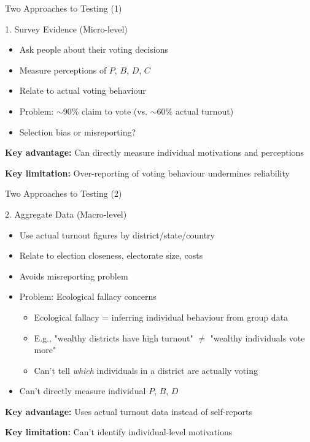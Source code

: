 \documentclass[10pt]{beamer}
\begin{document}
\begin{frame}{Two Approaches to Testing (1)}
\begin{block}{1. Survey Evidence (Micro-level)}
\begin{itemize}
\item Ask people about their voting decisions
\item Measure perceptions of $P$, $B$, $D$, $C$
\item Relate to actual voting behaviour
\item \alert{Problem:} $\sim$90\% claim to vote (vs. $\sim$60\% actual turnout)
\item Selection bias or misreporting?
\end{itemize}
\end{block}

\vspace{0.5cm}

\textbf{Key advantage:} Can directly measure individual motivations and perceptions

\textbf{Key limitation:} Over-reporting of voting behaviour undermines reliability
\end{frame}

\begin{frame}{Two Approaches to Testing (2)}
\begin{block}{2. Aggregate Data (Macro-level)}
\begin{itemize}
\item Use actual turnout figures by district/state/country
\item Relate to election closeness, electorate size, costs
\item Avoids misreporting problem
\item \alert{Problem:} Ecological fallacy concerns
\begin{itemize}
\footnotesize
\item Ecological fallacy = inferring individual behaviour from group data
\item E.g., "wealthy districts have high turnout" $\neq$ "wealthy individuals vote more"
\item Can't tell \emph{which} individuals in a district are actually voting
\end{itemize}
\item Can't directly measure individual $P$, $B$, $D$
\end{itemize}
\end{block}



\textbf{Key advantage:} Uses actual turnout data instead of self-reports

\textbf{Key limitation:} Can't identify individual-level motivations
\end{frame}
\end{document}
